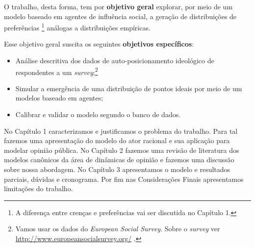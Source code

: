 O trabalho, desta forma, tem por \textbf{objetivo geral} explorar, por meio
de um modelo baseado em agentes de influência social, a geração de distribuições
de preferências \footnote{A diferença entre crenças e preferências vai ser
discutida no Capítulo 1.} análogas a distribuições empíricas.

Esse objetivo geral suscita os seguintes \textbf{objetivos específicos}:

\begin{itemize}
\item Análise descritiva dos dados de auto-posicionamento ideológico de
  respondentes a um \textit{survey};\footnote{Vamos usar os dados do
    \textit{European Social Survey}. Sobre o \textit{survey} ver
    \url{http://www.europeansocialsurvey.org/} .}
\item Simular a emergência de uma distribuição de pontos ideais por meio de um
  modelos baseado em agentes; 
\item Calibrar e validar o modelo segundo o banco de dados.
\end{itemize}


No Capítulo 1 caracterizamos e justificamos o problema do trabalho. Para tal
fazemos uma apresentação do modelo do ator racional e sua aplicação para modelar
opinião pública. No Capítulo 2 fazemos uma revisão de literatura dos modelos
canônicos da área de dinâmicas de opinião e fazemos uma discussão sobre nossa
abordagem. No Capítulo 3 apresentamos o modelo e resultados parciais, dúvidas e
cronograma. Por fim nas Considerações Finais apresentamos limitações do trabalho.






